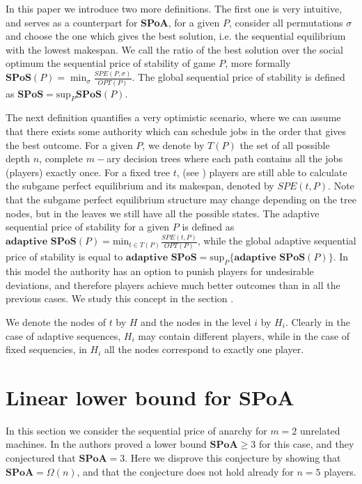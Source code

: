 \documentclass[runningheads]{llncs}
\newcommand{\SPoA}{\textbf{SPoA}\xspace}
\newcommand{\SPoS}{\textbf{SPoS}\xspace}
\newcommand{\aSPoS}{\textbf{adaptive SPoS}\xspace}
\begin{document}
In this paper we introduce two more definitions. The first one is very intuitive, and serves as a counterpart for \SPoA, for a given $P$, consider all permutations $\sigma$ and choose the one which gives the best solution, i.e. the sequential equilibrium with the lowest makespan. We call the ratio of the best solution over the social optimum the sequential price of stability of game $P$, more formally $\SPoS(P) = \min_{\sigma}\frac{SPE(P,\sigma)}{OPT(P)}$. The global sequential price of stability is defined as $\SPoS = \text{sup}_{P}\SPoS(P)$.

The next definition quantifies a very optimistic scenario, where we can assume that there exists some authority which can schedule jobs in the order that gives the best outcome. For a given $P$, we denote by $T(P)$ the set of all possible depth $n$, complete $m-$ary  decision trees where each path contains all the jobs (players) exactly once. For a fixed tree $t$, (see ) players are still able to calculate the subgame perfect equilibrium and its makespan, denoted by $SPE(t,P)$. Note that the subgame perfect equilibrium structure may change depending on the tree nodes, but in the leaves we still have all the possible states. The adaptive sequential price of stability for a given $P$ is  defined as $\aSPoS(P) = \text{min}_{t\in T(P)}\frac{SPE(t,P)}{OPT(P)}$, while the global adaptive sequential price of stability is equal to $\aSPoS = \text{sup}_P\{\aSPoS(P)\}$. In this model the authority has an option to punish players for undesirable deviations, and therefore players achieve much better outcomes than in all the previous cases. We study this concept in the section . 

We denote the nodes of $t$ by $H$ and the nodes in the level $i$ by $H_i$. Clearly in the case of adaptive sequences, $H_i$ may contain different players, while in the case of fixed sequencies, in $H_i$ all the nodes correspond to exactly one player. 

\section{Linear lower bound for \SPoA}\label{sec:counterexample}

In this section we consider the sequential price of anarchy for $m=2$ unrelated machines. In \cite{Hassin} the authors proved a lower bound $\SPoA\geq 3$ for this case, and they conjectured that $\SPoA=3$. Here we disprove this conjecture by showing that $\SPoA = \Omega(n)$, and that the conjecture does not hold already for $n=5$ players.
\end{document}
